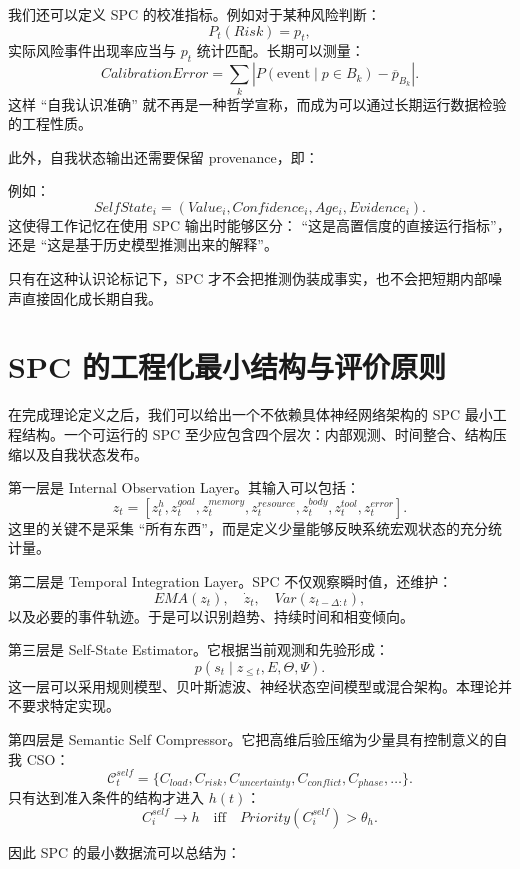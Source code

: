 我们还可以定义 SPC 的校准指标。例如对于某种风险判断：
\[
P_t(Risk)=p_t,
\]
实际风险事件出现率应当与 $p_t$ 统计匹配。长期可以测量：
\[
CalibrationError
=
\sum_k
\left|
P(\mathrm{event}\mid p\in B_k)
-
\overline{p}_{B_k}
\right|.
\]
这样 ``自我认识准确'' 就不再是一种哲学宣称，而成为可以通过长期运行数据检验的工程性质。

此外，自我状态输出还需要保留 provenance，即：
\begin{statementbox}
\centering
{}
\end{statementbox}
例如：
\[
SelfState_i
=
(
Value_i,
Confidence_i,
Age_i,
Evidence_i
).
\]
这使得工作记忆在使用 SPC 输出时能够区分：
``这是高置信度的直接运行指标''，
还是
``这是基于历史模型推测出来的解释''。

只有在这种认识论标记下，SPC 才不会把推测伪装成事实，也不会把短期内部噪声直接固化成长期自我。

\section{SPC 的工程化最小结构与评价原则}

在完成理论定义之后，我们可以给出一个不依赖具体神经网络架构的 SPC 最小工程结构。一个可运行的 SPC 至少应包含四个层次：内部观测、时间整合、结构压缩以及自我状态发布。

第一层是 Internal Observation Layer。其输入可以包括：
\[
z_t=
[
z_t^{h},
z_t^{goal},
z_t^{memory},
z_t^{resource},
z_t^{body},
z_t^{tool},
z_t^{error}
].
\]
这里的关键不是采集 ``所有东西''，而是定义少量能够反映系统宏观状态的充分统计量。

第二层是 Temporal Integration Layer。SPC 不仅观察瞬时值，还维护：
\[
EMA(z_t),
\quad
\dot z_t,
\quad
Var(z_{t-\Delta:t}),
\]
以及必要的事件轨迹。于是可以识别趋势、持续时间和相变倾向。

第三层是 Self-State Estimator。它根据当前观测和先验形成：
\[
p(s_t\mid z_{\le t},E,\Theta,\Psi).
\]
这一层可以采用规则模型、贝叶斯滤波、神经状态空间模型或混合架构。本理论并不要求特定实现。

第四层是 Semantic Self Compressor。它把高维后验压缩为少量具有控制意义的自我 CSO：
\[
\mathcal C_t^{self}
=
\{
C_{load},
C_{risk},
C_{uncertainty},
C_{conflict},
C_{phase},
\ldots
\}.
\]
只有达到准入条件的结构才进入 $h(t)$：
\[
C_i^{self}\rightarrow h
\quad
\text{iff}
\quad
Priority(C_i^{self})>\theta_h.
\]

因此 SPC 的最小数据流可以总结为：
\begin{statementbox}
\centering
{}
\end{statementbox}

